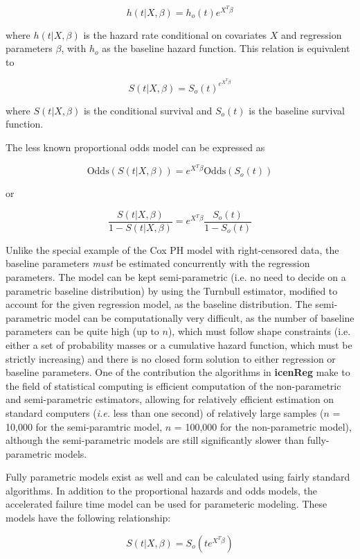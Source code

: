 \documentclass[a4paper]{article}
\begin{document}
\[ h(t | X, \beta) = h_o(t) e^{X^T \beta} \]
  
where $h(t | X, \beta)$ is the hazard rate conditional on covariates $X$ and regression parameters $\beta$, with $h_o$ as the baseline hazard function. This relation is equivalent to 

\[S(t | X, \beta) = S_o(t)^{e^{X^T \beta} } \]
  
where $S(t| X, \beta)$ is the conditional survival and $S_o(t)$ is the baseline survival function. 
  
The less known proportional odds model can be expressed as
  
\[\text{Odds}(S(t | X, \beta)) = e^{X^T \beta} \text{Odds}(S_o(t)) \]
\begin{center}  
  or
\end{center}
\[ \frac{S(t | X, \beta)} {1 - S(t | X, \beta) } = e^{X^T \beta}\frac{S_o(t)} {1 - S_o(t)} \]
  
  
Unlike the special example of the Cox PH model with right-censored data, the baseline parameters \emph{must} be estimated concurrently with the regression parameters. The model can be kept semi-parametric (i.e. no need to decide on a parametric baseline distribution) by using the Turnbull estimator, modified to account for the given regression model, as the baseline distribution. The semi-parametric model can be computationally very difficult, as the number of baseline parameters can be quite high (up to $n$), which must follow shape constraints (i.e. either a set of probability masses or a cumulative hazard function, which must be strictly increasing) and there is no closed form solution to either regression or baseline parameters. One of the contribution the algorithms in {\bf icenReg} make to the field of statistical computing is efficient computation of the non-parametric and semi-parametric estimators, allowing for relatively efficient estimation on standard computers (\emph{i.e.} less than one second) of relatively large samples ($n$ = 10,000 for the semi-paramtric model, $n$ = 100,000 for the non-parametric model), although the semi-parametric models are still significantly slower than fully-parametric models. 
  
  
Fully parametric models exist as well and can be calculated using fairly standard algorithms. In addition to the proportional hazards and odds models, the accelerated failure time  model can be used for parameteric modeling. These models have the following relationship:  
  
\[ S(t | X, \beta) = S_o(t e ^ {X^T \beta}) \]
\end{document}

